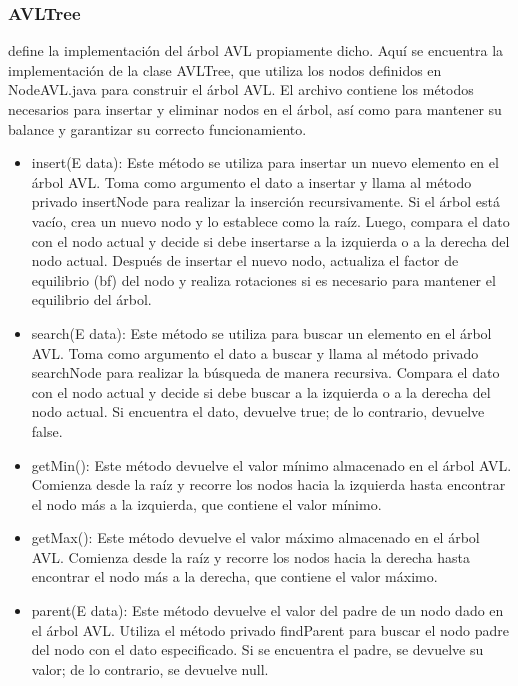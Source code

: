 


\subsubsection*{AVLTree}
define la implementación del árbol AVL propiamente dicho. Aquí se encuentra la implementación de la clase AVLTree, que utiliza los nodos definidos en NodeAVL.java para construir el árbol AVL. El archivo contiene los métodos necesarios para insertar y eliminar nodos en el árbol, así como para mantener su balance y garantizar su correcto funcionamiento.

\begin{itemize}
    \item insert(E data): Este método se utiliza para insertar un nuevo elemento en el árbol AVL. Toma como argumento el dato a insertar y llama al método privado insertNode para realizar la inserción recursivamente. Si el árbol está vacío, crea un nuevo nodo y lo establece como la raíz. Luego, compara el dato con el nodo actual y decide si debe insertarse a la izquierda o a la derecha del nodo actual. Después de insertar el nuevo nodo, actualiza el factor de equilibrio (bf) del nodo y realiza rotaciones si es necesario para mantener el equilibrio del árbol.

\item search(E data): Este método se utiliza para buscar un elemento en el árbol AVL. Toma como argumento el dato a buscar y llama al método privado searchNode para realizar la búsqueda de manera recursiva. Compara el dato con el nodo actual y decide si debe buscar a la izquierda o a la derecha del nodo actual. Si encuentra el dato, devuelve true; de lo contrario, devuelve false.

\item getMin(): Este método devuelve el valor mínimo almacenado en el árbol AVL. Comienza desde la raíz y recorre los nodos hacia la izquierda hasta encontrar el nodo más a la izquierda, que contiene el valor mínimo.

\item getMax(): Este método devuelve el valor máximo almacenado en el árbol AVL. Comienza desde la raíz y recorre los nodos hacia la derecha hasta encontrar el nodo más a la derecha, que contiene el valor máximo.

\item parent(E data): Este método devuelve el valor del padre de un nodo dado en el árbol AVL. Utiliza el método privado findParent para buscar el nodo padre del nodo con el dato especificado. Si se encuentra el padre, se devuelve su valor; de lo contrario, se devuelve null.


\end{itemize}
